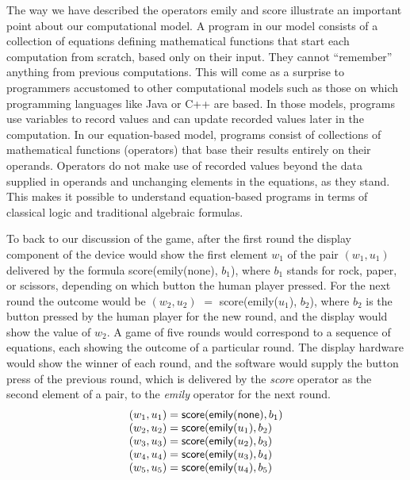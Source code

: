 The way we have described the operators \textsf{emily} and \textsf{score}
illustrate an important point about our computational model.
A program in our model consists of a collection of equations
defining mathematical functions that start each computation from scratch,
based only on their input. They cannot ``remember'' anything from previous computations.
This will come as a surprise to programmers accustomed
to other computational models such as those on which
programming languages like Java or C++ are based.
In those models, programs use variables to record values
and can update recorded values later in the computation.
In our equation-based model,
programs consist of collections of mathematical functions (operators)
that base their results entirely on their operands.
Operators do not make use of recorded values
beyond the data supplied in operands
and unchanging elements in the equations, as they stand.
This makes it possible to
understand equation-based programs in terms of classical
logic and traditional algebraic formulas.

To back to our discussion of the game,
after the first round the display component of the device
would show the first element $w_1$ of the pair $(w_1, u_1)$ delivered by the formula
\textsf{score}(\textsf{emily}(\textsf{none}), $b_1$),
where $b_1$ stands for rock, paper, or scissors, depending on which button
the human player pressed.
For the next round the outcome would be
$(w_2, u_2)$ $=$ \textsf{score}(\textsf{emily}($u_1$), $b_2$),
where $b_2$ is the button pressed by the human player for the new round,
and the display would show the value of $w_2$.
A game of five rounds would correspond to a sequence of equations,
each showing the outcome of a particular round.
The display hardware would show the winner of each round,
and the software would supply the button press of the previous round, which
is delivered by the \textit{score} operator as the second
element of a pair, to the \textit{emily} operator for the next round.
\begin{displaymath}
        \begin{array}{ll}
        (w_1, u_1) = \mbox{\textsf{score}}(\mbox{\textsf{emily}}(\mbox{\textsf{none}}), b_1) \\
        (w_2, u_2) = \mbox{\textsf{score}}(\mbox{\textsf{emily}}(u_1), b_2) \\
        (w_3, u_3) = \mbox{\textsf{score}}(\mbox{\textsf{emily}}(u_2), b_3) \\
        (w_4, u_4) = \mbox{\textsf{score}}(\mbox{\textsf{emily}}(u_3), b_4) \\
        (w_5, u_5) = \mbox{\textsf{score}}(\mbox{\textsf{emily}}(u_4), b_5)
        \end{array}
\end{displaymath}

